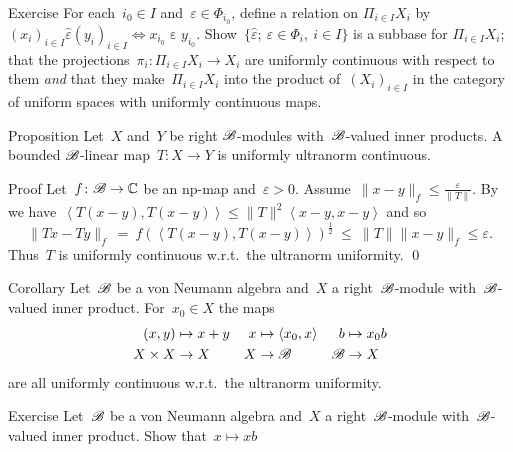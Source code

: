 \begin{parsec}
\begin{point}{Exercise}
    For each~$i_0 \in I$
    and~$\varepsilon \in \Phi_{i_0}$,
    define a relation on
    $\Pi_{i \in I} X_i$ by
    $(x_i)_{i \in I} \mathrel{\hat\varepsilon} (y_i)_{i \in I}
    \iff x_{i_0} \mathrel\varepsilon y_{i_0}$.
    Show~$\{ \hat\varepsilon;\ \varepsilon \in \Phi_i, \ i\in I \}$
    is a subbase for $\Pi_{i \in I} X_i$;
    that the projections~$\pi_i \colon \Pi_{i \in I} X_i \to X_i$
    are uniformly continuous with respect to them
    \emph{and} that they make~$\Pi_{i \in I} X_i$
    into the product of~$(X_i)_{i \in I}$
    in the category of uniform spaces with uniformly continuous maps.
\end{point}
\end{parsec}

\begin{parsec}%
\begin{point}{Proposition}%
Let~$X$ and~$Y$ be right $\mathscr{B}$-modules
    with~$\mathscr{B}$-valued inner products.
A bounded $\mathscr{B}$-linear map~$T\colon X \to Y$
    is uniformly ultranorm continuous.
\begin{point}{Proof}%
Let~$f\colon \mathscr{B} \to \mathbb{C}$ be an np-map
    and~$\varepsilon > 0$.
Assume~$\|x-y\|_f \leq \frac{\varepsilon}{\|T\|}$.
By 
we have~$\left<T(x-y), T(x-y)\right> \leq \|T\|^2\left<x-y,x-y\right>$
and so
\begin{equation*}
    \|Tx - Ty\|_f \  =\  f(\left<T(x-y),T(x-y)\right>)^{\frac{1}{2}}
\ \leq\  \|T\| \|x-y\|_f \leq \varepsilon.
\end{equation*}
Thus~$T$ is uniformly continuous w.r.t.~the ultranorm uniformity. \qed
\end{point}
\end{point}
\begin{point}[ultranormcontstruct]{Corollary}%
Let~$\mathscr{B}$ be a von Neumann algebra
    and~$X$ a right~$\mathscr{B}$-module
    with~$\mathscr{B}$-valued inner product.
For~$x_0 \in X$ the maps
\begin{align*}
    (x,y) &\mapsto x+y & x &\mapsto \left<x_0, x\right>
    & b &\mapsto x_0 b \\
    X\times X &\to X & X &\to \mathscr{B} & \mathscr{B} & \to X
\end{align*}
are all uniformly continuous w.r.t.~the ultranorm uniformity.
\end{point}
\begin{point}[ultranormscalar]{Exercise}%
Let~$\mathscr{B}$ be a von Neumann algebra and~$X$ a right~$\mathscr{B}$-module
    with~$\mathscr{B}$-valued inner product.
Show that~$x \mapsto xb$

\end{point}
\end{parsec}
